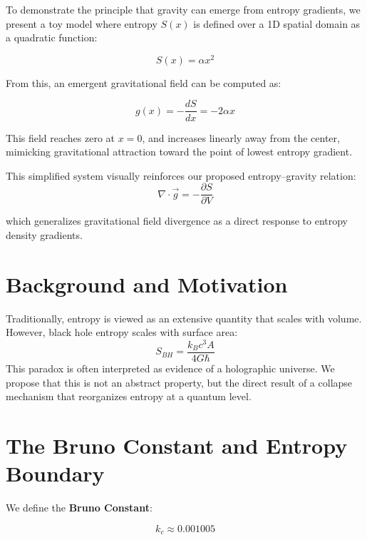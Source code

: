 \documentclass[12pt]{article}
\begin{document}
To demonstrate the principle that gravity can emerge from entropy gradients, we present a toy model where entropy \( S(x) \) is defined over a 1D spatial domain as a quadratic function:

\[
S(x) = \alpha x^2
\]

From this, an emergent gravitational field can be computed as:

\[
g(x) = -\frac{dS}{dx} = -2\alpha x
\]

This field reaches zero at \( x = 0 \), and increases linearly away from the center, mimicking gravitational attraction toward the point of lowest entropy gradient.



This simplified system visually reinforces our proposed entropy–gravity relation:
\[
\nabla \cdot \vec{g} = -\frac{\partial S}{\partial V}
\]

which generalizes gravitational field divergence as a direct response to entropy density gradients.
\section{Background and Motivation}
Traditionally, entropy is viewed as an extensive quantity that scales with volume. However, black hole entropy scales with surface area:
\begin{equation}
S_{BH} = \frac{k_B c^3 A}{4 G \hbar}
\end{equation}
This paradox is often interpreted as evidence of a holographic universe. We propose that this is not an abstract property, but the direct result of a collapse mechanism that reorganizes entropy at a quantum level.

\section{The Bruno Constant and Entropy Boundary}

We define the \textbf{Bruno Constant}:

\begin{equation}
\boxed{k_c \approx 0.001005}
\end{equation}
\end{document}
